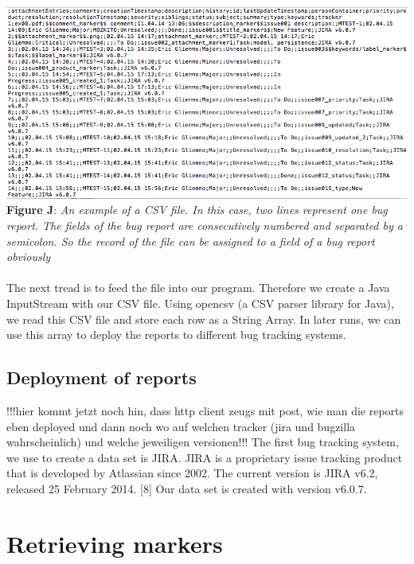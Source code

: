 \\ \\ \includegraphics[width=1.0\textwidth]{example-csv.png}  \\\textbf{Figure J}: \textit{An example of a CSV file. In this case, two lines represent one bug report. The fields of the bug report are consecutively numbered and separated by a semicolon. So the record of the file can be assigned to a field of a bug report obviously}  \\ \\ The next tread is to feed the file into our program. Therefore we create a Java InputStream with our CSV file. Using opencsv (a CSV parser library for Java),  we read this CSV file and store each row as a String Array. In later runs, we can use this array to deploy the reports to different bug tracking systems.
 


\subsection{Deployment of reports} 
!!!hier kommt jetzt noch hin, dass http client zeugs mit post, wie man die reports eben deployed und dann noch wo auf welchen tracker (jira und bugzilla wahrscheinlich) und welche jeweiligen versionen!!!
The first bug tracking system, we use to create a data set is JIRA. JIRA is a proprietary issue tracking product that is developed by Atlassian since 2002. The current version is JIRA v6.2, released 25 February 2014. [8] Our data set is created with version v6.0.7.

\section{Retrieving markers}
\label{Retrieving markers}


